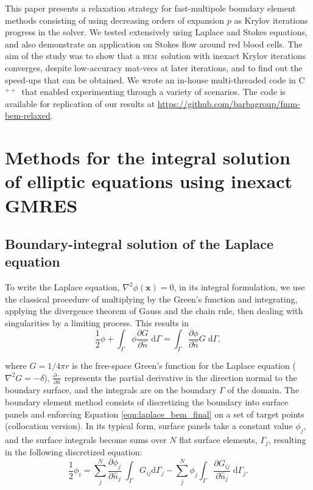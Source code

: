 \documentclass[final,leqno,]{siamltex1213}
\newcommand{\bem}{\textsc{bem}\xspace}
\newcommand{\cpp}{C$^{++}$}
\newcommand{\di}[1]{\text{d}#1}
\newcommand{\partiald}[2]{\frac{\partial #1}{\partial #2}}
\newcommand{\nhat}{\hat{n}}
\newcommand{\vect}[1]{\mathbf{#1}}
\begin{document}
This paper presents a relaxation strategy for fast-multipole boundary element methods consisting of using decreasing orders of expansion $p$ as Krylov iterations progress in the solver. We tested extensively using Laplace and Stokes equations, and also demonstrate an application on Stokes flow around red blood cells. The aim of the study was to show that a \bem\ solution with inexact Krylov iterations converges, despite low-accuracy mat-vecs at later iterations, and to find out the speed-ups that can be obtained. We wrote an in-house  multi-threaded code in \cpp\ that enabled experimenting through a variety of scenarios. The code is available for replication of our results at \href{https://github.com/barbagroup/fmm-bem-relaxed}{https://github.com/barbagroup/fmm-bem-relaxed}.

\section{Methods for the integral solution of elliptic equations using inexact {\small GMRES}}

\subsection{Boundary-integral solution of the Laplace equation}

To write the Laplace equation, $\nabla^{2}\phi(\vect{x}) = 0$,  in its integral formulation, we use the classical procedure of multiplying by the Green's function and integrating, applying the divergence theorem of Gauss and the chain rule, then dealing with singularities by a limiting process. This results in
%
\begin{equation}\label{eqn:laplace_bem_final}
	\frac{1}{2}\phi + \int_{\Gamma} \phi\partiald{G}{\nhat}\;\di{\Gamma} = \int_{\Gamma}\partiald{\phi}{\nhat}G\;\di{\Gamma},
\end{equation}

\noindent where $G = 1/4\pi r$ is the free-space Green's function for the Laplace equation ($\nabla^{2}G = -\delta$),  $\partiald{\cdots}{\nhat}$ represents the partial derivative in the direction normal to the boundary surface, and the integrals are on the boundary $\Gamma$ of the domain. The boundary element method consists of discretizing the boundary into surface panels and enforcing Equation \eqref{eqn:laplace_bem_final} on a set of target points (collocation version). In its typical form, surface panels take a constant value $\phi_j$, and the surface integrals become sums over $N$ flat surface elements, $\Gamma_j$, resulting in the following discretized equation:
%
\begin{equation}
	\frac{1}{2}\phi_i = \sum_j^{N} \partiald{\phi_j}{\nhat_j}\;\int_{\Gamma}G_{ij}\di{\Gamma_j} - \sum_j^{N} \phi_j\int_{\Gamma}\partiald{G_{ij}}{\nhat_j}\;\di{\Gamma_j}.
\end{equation}
\end{document}
